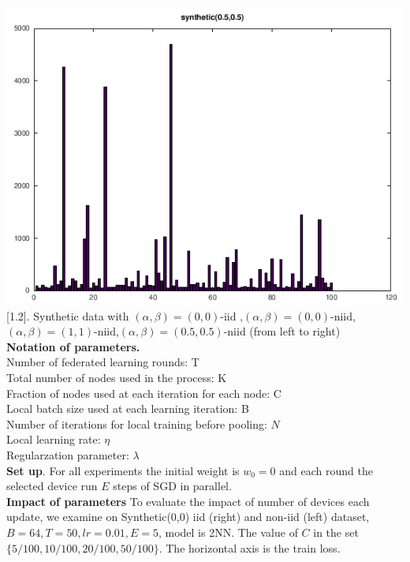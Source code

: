 \documentclass{article}
\theoremstyle{theorem}
\theoremstyle{definition}
\begin{document}
			\includegraphics[scale=0.15]{sy0.50.5.png}
						\figurename[1.2]{. Synthetic data with $(\alpha, \beta) =(0,0)$-iid ,$(\alpha, \beta) =(0,0)$-niid,$(\alpha, \beta) =(1,1)$-niid,$(\alpha, \beta) =(0.5,0.5)$-niid (from left to right)  }\\					
\textbf{Notation of parameters.}\\
Number of federated learning rounds: T\\
Total number of nodes used in the process: K\\
Fraction of nodes used at each iteration for each node: C\\
Local batch size used at each learning iteration: B\\
Number of iterations for local training before pooling: $N$\\
Local learning rate: $\eta $\\
Regularzation parameter: $\lambda$ \\
\textbf{Set up}. For all experiments the initial weight is $w_0=0$ and each round the selected device run $E$ steps of SGD in parallel. 					\\
\textbf{Impact of parameters}
To evaluate the impact of number of devices each update, we examine on Synthetic(0,0) iid (right) and non-iid (left) dataset, $ B=64, T=50,lr=0.01,E=5$, model is 2NN. The value of $C$ in the set $\{5/100,10/100,20/100,50/100\}$. The horizontal axis is the train loss.
\end{document}
